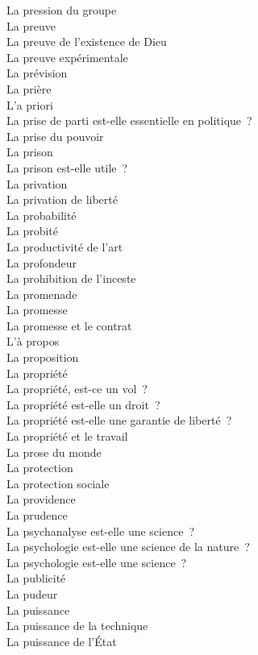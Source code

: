\documentclass[a4paper,12pt]{article}
\begin{document}
La pression du groupe \\
La preuve \\
La preuve de l'existence de Dieu \\
La preuve expérimentale \\
La prévision \\
La prière \\
L'a priori \\
La prise de parti est-elle essentielle en politique ? \\
La prise du pouvoir \\
La prison \\
La prison est-elle utile ? \\
La privation \\
La privation de liberté \\
La probabilité \\
La probité \\
La productivité de l'art \\
La profondeur \\
La prohibition de l'inceste \\
La promenade \\
La promesse \\
La promesse et le contrat \\
L'à propos \\
La proposition \\
La propriété \\
La propriété, est-ce un vol ? \\
La propriété est-elle un droit ? \\
La propriété est-elle une garantie de liberté ? \\
La propriété et le travail \\
La prose du monde \\
La protection \\
La protection sociale \\
La providence \\
La prudence \\
La psychanalyse est-elle une science ? \\
La psychologie est-elle une science de la nature ? \\
La psychologie est-elle une science ? \\
La publicité \\
La pudeur \\
La puissance \\
La puissance de la technique \\
La puissance de l'État \\
\end{document}

